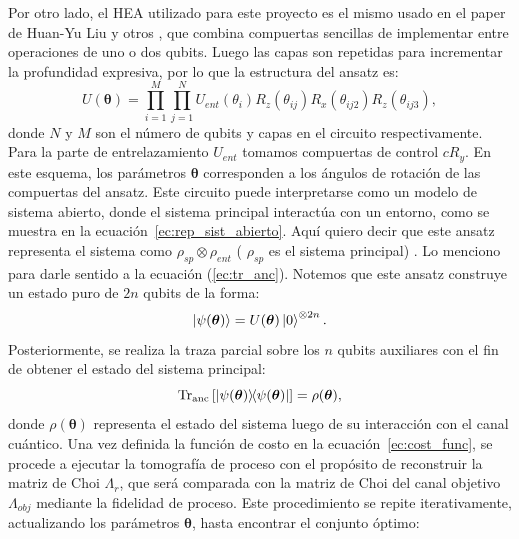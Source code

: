 \documentclass[letterpaper,12pt]{thesisECFM}
\theoremstyle{plain}
\theoremstyle{definition}
\theoremstyle{definition}
\theoremstyle{remark}
\newcommand{\1}{\mathbb{1}}
\begin{document}
Por otro lado, el HEA utilizado para este proyecto es el mismo usado en el
paper de Huan-Yu Liu y otros \cite{Liu_2021,Sim_2019}, que combina
compuertas sencillas de implementar entre operaciones de uno o dos qubits.
Luego las capas son repetidas para incrementar la profundidad expresiva, por
lo que la estructura del ansatz es:
 \begin{equation}
 \label{ec:ansatz}
     U(\bm{\theta}) =\prod_{i=1}^{M} \prod_{j=1}^N U_{ent} (\theta_i)R_z(\theta_{ij})R_x(\theta_{ij2})R_z(\theta_{ij3}),
 \end{equation}
donde $N$ y $M$ son el número de qubits y capas en el circuito respectivamente.
Para la parte de entrelazamiento $U_{ent}$ tomamos compuertas de control
$cR_y$.  En este esquema, los parámetros $\bm{\theta}$ corresponden a los
ángulos de rotación de las compuertas del ansatz. Este circuito puede
interpretarse como un modelo de sistema abierto, donde el sistema principal
interactúa con un entorno, como se muestra en la
ecuación~\ref{ec:rep_sist_abierto}.
Aquí quiero decir que este ansatz representa el sistema como $\rho_{sp} \otimes
\rho_{ent}$ ( $\rho_{sp}$ es el sistema principal) . Lo menciono para darle
sentido a la ecuación  (\ref{ec:tr_anc}).  Notemos que este ansatz construye un
estado puro de  $2n$ qubits de la forma:
\begin{equation} 
    \ket{\psi(\bm{\theta})} = U(\bm{\theta})\ket{0}^{\otimes 2n}.
\end{equation}
Posteriormente, se realiza la traza parcial sobre los $n$ qubits auxiliares con el fin de obtener el estado del sistema principal:
\begin{equation} \label{ec:tr_anc}    \text{Tr}_{\text{anc}}\left[\ketbra{\psi(\bm{\theta})}{\psi(\bm{\theta})}\right] = \rho(\bm{\theta}),
\end{equation}
donde $\rho(\bm{\theta})$ representa el estado del sistema luego de su
interacción con el canal cuántico. Una vez definida la función de costo en la
ecuación~\ref{ec:cost_func}, se procede a ejecutar la tomografía de proceso
con el propósito de reconstruir la matriz de Choi
$\Lambda_{r}$, que será comparada con la matriz de Choi del canal objetivo
$\Lambda_{obj}$ mediante la fidelidad de proceso.
Este procedimiento se repite iterativamente, actualizando
los parámetros $\bm{\theta}$, hasta encontrar el conjunto óptimo:
\end{document}
